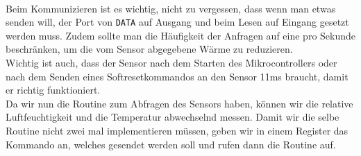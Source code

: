 \documentclass[]{article}
\begin{document}
\\Beim Kommunizieren ist es wichtig, nicht zu vergessen, dass wenn man etwas senden will, der Port von \texttt{DATA} auf Ausgang und beim Lesen auf Eingang gesetzt werden muss. Zudem sollte man die Häufigkeit der Anfragen auf eine pro Sekunde beschränken, um die vom Sensor abgegebene Wärme zu reduzieren.
\\Wichtig ist auch, dass der Sensor nach dem Starten des Mikrocontrollers oder nach dem Senden eines Softresetkommandos an den Sensor 11ms braucht, damit er richtig funktioniert.
\\Da wir nun die Routine zum Abfragen des Sensors haben, können wir die relative Luftfeuchtigkeit und die Temperatur abwechselnd messen. Damit wir die selbe Routine nicht zwei mal implementieren müssen, geben wir in einem Register das Kommando an, welches gesendet werden soll und rufen dann die Routine auf.
\end{document}
